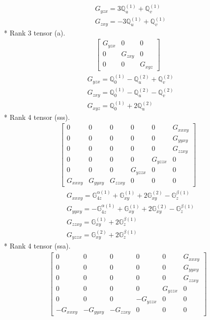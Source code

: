 \documentclass[fleqn,8pt,landscape]{jsarticle}
\begin{document}
\begin{align*}
& G_{yzx} = 3 \mathbb{Q}_{u}^{(1)} + \mathbb{Q}_{v}^{(1)} \\
& G_{zxy} = - 3 \mathbb{Q}_{u}^{(1)} + \mathbb{Q}_{v}^{(1)}
\end{align*}
* Rank 3 tensor (a).
\begin{align*}
\begin{bmatrix} G_{yzx} & 0 & 0 \\ 0 & G_{zxy} & 0 \\ 0 & 0 & G_{xyz} \end{bmatrix}
\end{align*}
\begin{align*}
& G_{yzx} = \mathbb{Q}_{0}^{(1)} - \mathbb{Q}_{u}^{(2)} + \mathbb{Q}_{v}^{(2)} \\
& G_{zxy} = \mathbb{Q}_{0}^{(1)} - \mathbb{Q}_{u}^{(2)} - \mathbb{Q}_{v}^{(2)} \\
& G_{xyz} = \mathbb{Q}_{0}^{(1)} + 2 \mathbb{Q}_{u}^{(2)}
\end{align*}
* Rank 4 tensor (sss).
\begin{align*}
\begin{bmatrix} 0 & 0 & 0 & 0 & 0 & G_{xxxy} \\ 0 & 0 & 0 & 0 & 0 & G_{yyxy} \\ 0 & 0 & 0 & 0 & 0 & G_{zzxy} \\ 0 & 0 & 0 & 0 & G_{yzzx} & 0 \\ 0 & 0 & 0 & G_{yzzx} & 0 & 0 \\ G_{xxxy} & G_{yyxy} & G_{zzxy} & 0 & 0 & 0 \end{bmatrix}
\end{align*}
\begin{align*}
& G_{xxxy} = \mathbb{G}_{4z}^{\alpha(1)} + \mathbb{G}_{xy}^{(1)} + 2 \mathbb{G}_{xy}^{(2)} - \mathbb{G}_{z}^{\beta(1)} \\
& G_{yyxy} = - \mathbb{G}_{4z}^{\alpha(1)} + \mathbb{G}_{xy}^{(1)} + 2 \mathbb{G}_{xy}^{(2)} - \mathbb{G}_{z}^{\beta(1)} \\
& G_{zzxy} = \mathbb{G}_{xy}^{(1)} + 2 \mathbb{G}_{z}^{\beta(1)} \\
& G_{yzzx} = \mathbb{G}_{xy}^{(2)} + 2 \mathbb{G}_{z}^{\beta(1)}
\end{align*}
* Rank 4 tensor (ssa).
\begin{align*}
\begin{bmatrix} 0 & 0 & 0 & 0 & 0 & G_{xxxy} \\ 0 & 0 & 0 & 0 & 0 & G_{yyxy} \\ 0 & 0 & 0 & 0 & 0 & G_{zzxy} \\ 0 & 0 & 0 & 0 & G_{yzzx} & 0 \\ 0 & 0 & 0 & - G_{yzzx} & 0 & 0 \\ - G_{xxxy} & - G_{yyxy} & - G_{zzxy} & 0 & 0 & 0 \end{bmatrix}
\end{align*}
\end{document}
